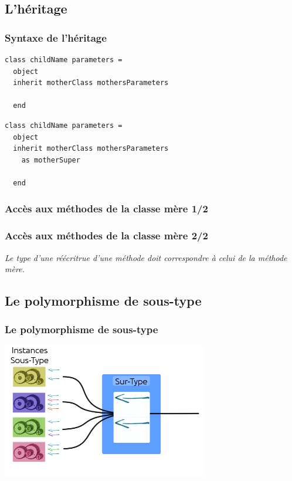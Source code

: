 \subsection{L'héritage} %
\begin{frame}[fragile]
	\frametitle{Syntaxe de l'héritage}
	\begin{lstlisting}
class childName parameters =
  object
  inherit motherClass mothersParameters

  end
	\end{lstlisting}
	\begin{lstlisting}
class childName parameters =
  object
  inherit motherClass mothersParameters 
    as motherSuper

  end
	\end{lstlisting}
\end{frame}

\begin{frame}
	\frametitle{Accès aux méthodes de la classe mère 1/2}
	
\end{frame}

\begin{frame}
	\frametitle{Accès aux méthodes de la classe mère 2/2}
	\textit{Le type d'une réécritrue d'une méthode doit correspondre à celui de la méthode mère.}
	
\end{frame}
\subsection{Le polymorphisme de sous-type} %
\begin{frame}
	\frametitle{Le polymorphisme de sous-type}
	\begin{center}
		\includegraphics[width=9cm]{pics/inclusionObjet.png}
	\end{center}
\end{frame}

